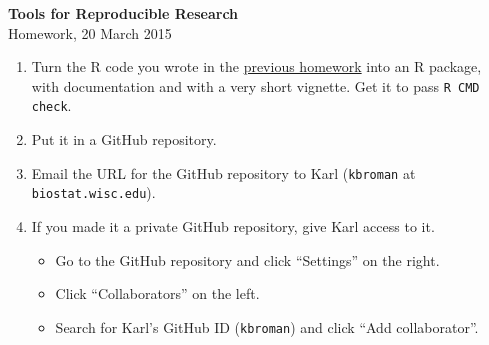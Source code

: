 \documentclass[12pt]{article}
\newcommand{\ttsm}{\tt \small}
\begin{document}
\thispagestyle{empty}

\textbf{Tools for Reproducible Research} \\
Homework, 20 March 2015

\bigskip

\begin{enumerate}
\item Turn the R code you wrote in the
  \href{http://kbroman.org/Tools4RR/assets/homework/08_homework.pdf}{previous
    homework} into an R package, with documentation and with a very
  short vignette. Get it to pass {\ttsm R CMD check}.

\item Put it in a GitHub repository.

\item Email the URL for the GitHub repository to Karl ({\ttsm kbroman}
  at {\ttsm biostat.wisc.edu}).

\item If you made it a private GitHub repository, give Karl access to
  it.
  \begin{itemize}
  \item Go to the GitHub repository and click ``Settings'' on the
    right.
  \item Click ``Collaborators'' on the left.
  \item Search for Karl's GitHub ID ({\ttsm kbroman}) and click ``Add
    collaborator''.
  \end{itemize}


\end{enumerate}
\end{document}

